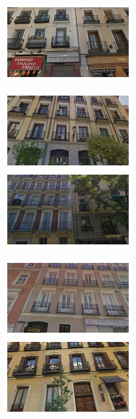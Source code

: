 \begin{figure}
\begin{minipage}{\linewidth}
\begin{minipage}{0.3\linewidth}
      \includegraphics[width=0.49\linewidth]{imgs/arch/mosaicsS2/mosaic0005.jpg}
      \\ \vspace{-3mm} \\
      \includegraphics[width=0.49\linewidth]{imgs/arch/mosaicsS2/mosaic0006.jpg}
      \includegraphics[width=0.49\linewidth]{imgs/arch/mosaicsS2/mosaic0007.jpg}
      \\ \vspace{-3mm} \\
      \includegraphics[width=0.49\linewidth]{imgs/arch/mosaicsS2/mosaic0008.jpg}
      \includegraphics[width=0.49\linewidth]{imgs/arch/mosaicsS2/mosaic0009.jpg}

\end{minipage}
\end{minipage}
\end{figure}

